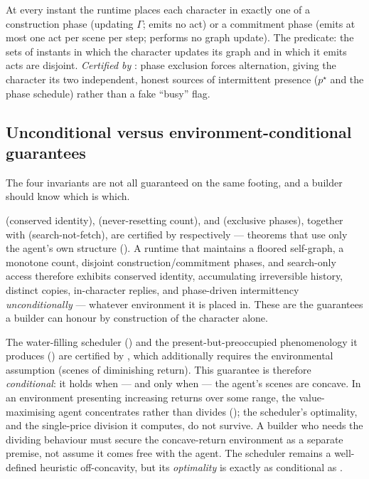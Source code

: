\documentclass[11pt,twocolumn,a4paper]{article}
\newcommand{\Self}{\Gamma}          %
\newcommand{\price}{p^{\star}}       %
\begin{document}
\begin{binv}
\label{inv:phase}
At every instant the runtime places each character in exactly one of a
construction phase (updating $\Self$; emits no act) or a commitment phase
(emits at most one act per scene per step; performs no graph update). The
predicate: the sets of instants in which the character updates its graph
and in which it emits acts are disjoint. \emph{Certified by}
: phase exclusion forces alternation, giving the
character its two independent, honest sources of intermittent presence
($\price$ and the phase schedule) rather than a fake ``busy'' flag.
\end{binv}

\subsection{Unconditional versus environment-conditional guarantees}
\label{sec:conditional}

The four invariants are not all guaranteed on the same footing, and a
builder should know which is which.

\begin{principle}
\label{prin:unconditional}
 (conserved identity),  (never-resetting
count), and  (exclusive phases), together with
 (search-not-fetch), are certified by
respectively --- theorems that use only the agent's own structure
(). A runtime
that maintains a floored self-graph, a monotone count, disjoint
construction/commitment phases, and search-only access therefore exhibits
conserved identity, accumulating irreversible history, distinct copies,
in-character replies, and phase-driven intermittency \emph{unconditionally}
--- whatever environment it is placed in. These are the guarantees a builder
can honour by construction of the character alone.
\end{principle}

\begin{principle}
\label{prin:conditional}
The water-filling scheduler () and the
present-but-preoccupied phenomenology it produces ()
are certified by , which additionally requires the
environmental assumption  (scenes of diminishing return).
This guarantee is therefore \emph{conditional}: it holds when --- and only
when --- the agent's scenes are concave. In an environment presenting
increasing returns over some range, the value-maximising agent concentrates
rather than divides (); the scheduler's optimality, and
the single-price division it computes, do not survive. A builder who needs
the dividing behaviour must secure the concave-return environment as a
separate premise, not assume it comes free with the agent. The scheduler
remains a well-defined heuristic off-concavity, but its \emph{optimality} is
exactly as conditional as .
\end{principle}
\end{document}
